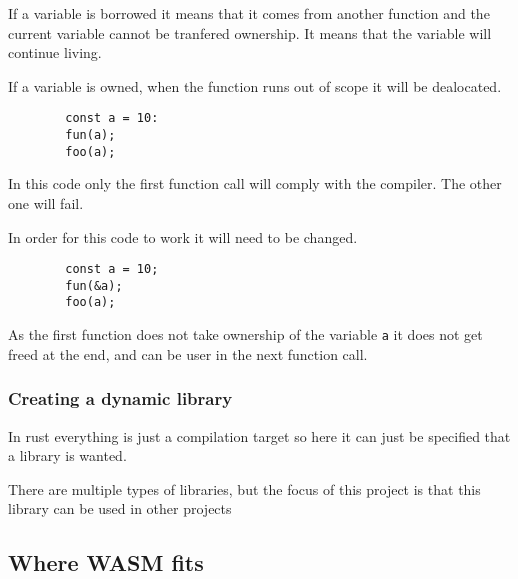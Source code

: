 \documentclass[12pt, letterpaper]{article}
\begin{document}
\begin{multicols}{2}
    If a variable is borrowed it means that it comes from another function and the current variable cannot be tranfered ownership. It means that the variable will continue living.

    If a variable is owned, when the function runs out of scope it will be dealocated.

    \begin{lstlisting}
        const a = 10:
        fun(a);
        foo(a);
    \end{lstlisting}

    In this code only the first function call will comply with the compiler. The other one will fail.

    In order for this code to work it will need to be changed.

    \begin{lstlisting}
        const a = 10;
        fun(&a);
        foo(a);
    \end{lstlisting}

    As the first function does not take ownership of the variable \verb|a| it does not get freed at the end, and can be user in the next function call.

    \subsubsection{Creating a dynamic library}

    In rust everything is just a compilation target so here it can just be specified that a library is wanted.

    There are multiple types of libraries, but the focus of this project is that this library can be used in other projects


    \subsection{Where WASM fits}
\end{multicols}
\end{document}
